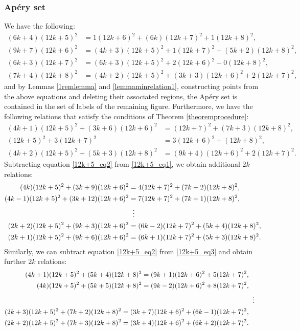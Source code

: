 \documentclass[12pt]{article}
\theoremstyle{remark}
\begin{document}
\subsubsection{Ap{\'e}ry set}
We have the following:
\begin{align}
    (6k+4)(12k+5)^2 &= 1(12k+6)^2 + (6k)(12k+7)^2 + 1(12k+8)^2, \label{12k+5minrelation0} \\
    (9k+7)(12k+6)^2 &= (4k+3)(12k+5)^2 + 1(12k+7)^2 + (5k+2)(12k+8)^2, \label{12k+5minrelation1} \\
    (6k+3)(12k+7)^2 &= (6k+3)(12k+5)^2 + 2(12k+6)^2 + 0(12k+8)^2, \label{12k+5minrelation2}\\
    (7k+4)(12k+8)^2 &= (4k+2)(12k+5)^2 + (3k+3)(12k+6)^2 + 2(12k+7)^2,  \label{12k+5minrelation3}
\end{align}
and by Lemmas \ref{1remlemma} and \ref{lemmaminrelation1}, constructing points from the above equations and deleting their associated regions, the Ap{\'e}ry set is contained in the set of labels of the remaining figure.
Furthermore, we have the following relations that satisfy the conditions of Theorem \ref{theoremprocedure}:
\begin{align}
  (4k+1)(12k+5)^2 + (3k+6)(12k+6)^2  &= (12k+7)^2 + (7k+3)(12k+8)^2, \label{12k+5_eq1}\\
    (12k+5)^2 + 3(12k+7)^2 &= 3(12k+6)^2 + (12k+8)^2,\label{12k+5_eq2}\\
    (4k+2)(12k+5)^2 + (5k+3)(12k+8)^2  &= (9k+4)(12k+6)^2 + 2(12k+7)^2.\label{12k+5_eq3}
\end{align}
Subtracting equation \eqref{12k+5_eq2} from \eqref{12k+5_eq1}, we obtain additional $2k$ relations:
\begin{equation}\label{12k+5_2kequations_1}
\begin{aligned}    
(4k)(12k+5)^2 + (3k+9)(12k+6)^2  &= 4(12k+7)^2 + (7k+2)(12k+8)^2,\\
(4k-1)(12k+5)^2 + (3k+12)(12k+6)^2  &= 7(12k+7)^2 + (7k+1)(12k+8)^2,\\
 & \hspace{5.6pt}  \vdots      \\
(2k+2)(12k+5)^2 + (9k+3)(12k+6)^2  &= (6k-2)(12k+7)^2 + (5k+4)(12k+8)^2,\\
(2k+1)(12k+5)^2 + (9k+6)(12k+6)^2  &= (6k+1)(12k+7)^2 + (5k+3)(12k+8)^2.
\end{aligned}
\end{equation}
Similarly, we can subtract equation \eqref{12k+5_eq2} from \eqref{12k+5_eq3} and obtain further $2k$ relations:
\begin{equation}\label{12k+5_2kequations_2}
\begin{aligned}    
(4k+1)(12k+5)^2 + (5k+4)(12k+8)^2  = (9k+1)(12k+6)^2 + 5(12k+7)^2,\\
(4k)(12k+5)^2 + (5k+5)(12k+8)^2  = (9k-2)(12k+6)^2 + 8(12k+7)^2,\\
 & \hspace{5.6pt}  \vdots      \\
(2k+3)(12k+5)^2 + (7k+2)(12k+8)^2  = (3k+7)(12k+6)^2 + (6k-1)(12k+7)^2,\\
(2k+2)(12k+5)^2 + (7k+3)(12k+8)^2  = (3k+4)(12k+6)^2 + (6k+2)(12k+7)^2.
\end{aligned}
\end{equation}
\end{document}
